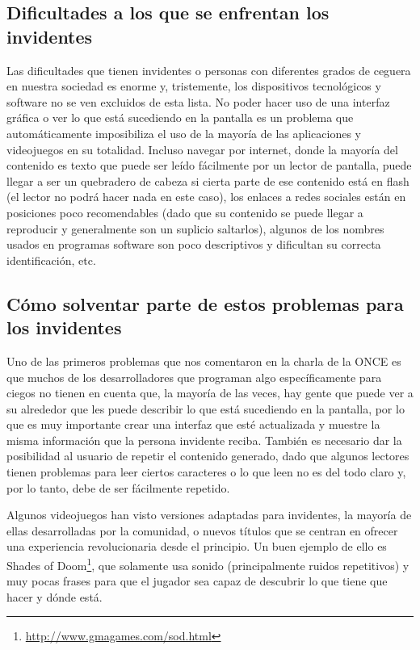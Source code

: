\subsection{Dificultades a los que se enfrentan los invidentes}

Las dificultades que tienen invidentes o personas con diferentes grados de ceguera en nuestra sociedad es enorme y, tristemente, los dispositivos tecnológicos y software no se ven excluidos de esta lista. 
No poder hacer uso de una interfaz gráfica o ver lo que está sucediendo en la pantalla es un problema que automáticamente imposibiliza el uso de la mayoría de las aplicaciones y videojuegos en su totalidad. Incluso navegar por internet, donde la mayoría del contenido es texto que puede ser leído fácilmente por un lector de pantalla, puede llegar a ser un quebradero de cabeza si cierta parte de ese contenido está en flash (el lector no podrá hacer nada en este caso), los enlaces a redes sociales están en posiciones poco recomendables (dado que su contenido se puede llegar a reproducir y generalmente son un suplicio saltarlos), algunos de los nombres usados en programas software son poco descriptivos y dificultan su correcta identificación, etc.

\subsection{Cómo solventar parte de estos problemas para los invidentes}

Uno de las primeros problemas que nos comentaron en la charla de la ONCE es que muchos de los desarrolladores que programan algo específicamente para ciegos no tienen en cuenta que, la mayoría de las veces, hay gente que puede ver a su alrededor que les puede describir lo que está sucediendo en la pantalla, por lo que es muy importante crear una interfaz que esté actualizada y muestre la misma información que la persona invidente reciba.
También es necesario dar la posibilidad al usuario de repetir el contenido generado, dado que algunos lectores tienen problemas para leer ciertos caracteres o lo que leen no es del todo claro y, por lo tanto, debe de ser fácilmente repetido.

Algunos videojuegos han visto versiones adaptadas para invidentes, la mayoría de ellas desarrolladas por la comunidad, o nuevos títulos que se centran en ofrecer una experiencia revolucionaria desde el principio. Un buen ejemplo de ello es Shades of Doom\footnote{\url{http://www.gmagames.com/sod.html}}, que solamente usa sonido (principalmente ruidos repetitivos) y muy pocas frases para que el jugador sea capaz de descubrir lo que tiene que hacer y dónde está.

